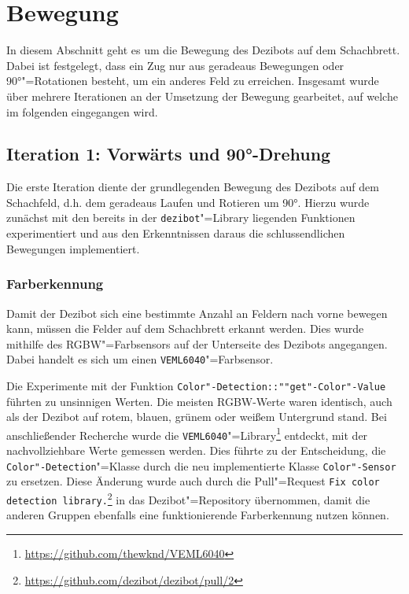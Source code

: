 
\section{Bewegung}
\label{sec:movement}

In diesem Abschnitt geht es um die Bewegung des Dezibots auf dem Schachbrett. Dabei ist festgelegt, dass ein Zug nur aus geradeaus Bewegungen oder 90°"=Rotationen besteht, um ein anderes Feld zu erreichen. Insgesamt wurde über mehrere Iterationen an der Umsetzung der Bewegung gearbeitet, auf welche im folgenden eingegangen wird.


\subsection{Iteration 1: Vorwärts und 90°-Drehung}
\label{sec:move-straight-turn}

Die erste Iteration diente der grundlegenden Bewegung des Dezibots auf dem Schachfeld, d.h. dem geradeaus Laufen und Rotieren um 90°. Hierzu wurde zunächst mit den bereits in der \texttt{dezibot}"=Library liegenden Funktionen experimentiert und aus den Erkenntnissen daraus die schlussendlichen Bewegungen implementiert. 

\subsubsection{Farberkennung}
\label{sec:color-detection}

Damit der Dezibot sich eine bestimmte Anzahl an Feldern nach vorne bewegen kann, müssen die Felder auf dem Schachbrett erkannt werden. Dies wurde mithilfe des RGBW"=Farbsensors auf der Unterseite des Dezibots angegangen. Dabei handelt es sich um einen \texttt{VEML6040}"=Farbsensor.

Die Experimente mit der Funktion \texttt{Color"-Detection::""get"-Color"-Value} führten zu unsinnigen Werten. Die meisten RGBW-Werte waren identisch, auch als der Dezibot auf rotem, blauen, grünem oder weißem Untergrund stand. Bei anschließender Recherche wurde die \texttt{VEML6040}"=Library\footnote{\url{https://github.com/thewknd/VEML6040}} entdeckt, mit der nachvollziehbare Werte gemessen werden. Dies führte zu der Entscheidung, die \texttt{Color"-Detection}"=Klasse durch die neu implementierte Klasse \texttt{Color"-Sensor} zu ersetzen. Diese Änderung wurde auch durch die Pull"=Request \texttt{Fix color detection library.}\footnote{\url{https://github.com/dezibot/dezibot/pull/2}} in das Dezibot"=Repository übernommen, damit die anderen Gruppen ebenfalls eine funktionierende Farberkennung nutzen können.

